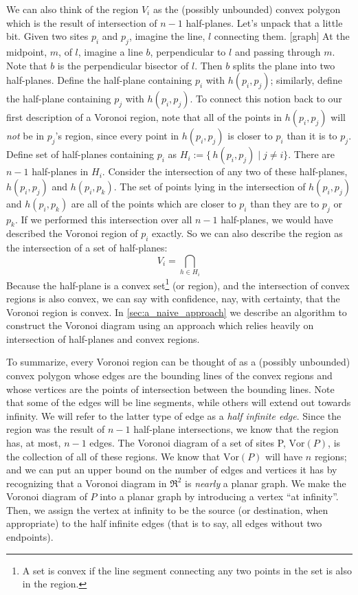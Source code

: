 \documentclass[12pt,twoside]{reedthesis}
\begin{document}
    We can also think of the region $V_{i}$ as the (possibly unbounded) convex polygon which is the result of intersection of $n-1$ half-planes. Let's unpack that a little bit. Given two sites $p_{i}$ and $p_{j}$, imagine the line, $l$ connecting them. [graph] At the midpoint, $m$, of $l$, imagine a line $b$, perpendicular to $l$ and passing through $m$. Note that $b$ is the perpendicular bisector of $l$. Then $b$ splits the plane into two half-planes. Define the half-plane containing $p_{i}$ with $h(p_{i}, p_{j})$; similarly, define the half-plane containing $p_{j}$ with $h(p_{i}, p_{j})$. To connect this notion back to our first description of a Voronoi region, note that all of the points in $h(p_{i}, p_{j})$ will \emph{not} be in $p_{j}$'s region, since every point in $h(p_{i}, p_{j})$ is closer to $p_{i}$ than it is to $p_{j}$. Define set of half-planes containing $p_{i}$ as $H_{i} := \{\,h(p_{i}, p_{j}) \mid j\neq i \}$. There are $n-1$ half-planes in $H_{i}$. Consider the intersection of any two of these half-planes, $h(p_{i}, p_{j})$ and $h(p_{i}, p_{k})$. The set of points lying in the intersection of $h(p_{i}, p_{j})$ and $h(p_{i}, p_{k})$ are all of the points which are closer to $p_{i}$ than they are to $p_{j}$ or $p_{k}$. If we performed this intersection over all $n-1$ half-planes, we would have described the Voronoi region of $p_{i}$ exactly. So we can also describe the region as the intersection of a set of half-planes:
    $$V_{i} = \bigcap_{h \in H_{i}}$$ 
    Because the half-plane is a convex set\footnote{A set is convex if the line segment connecting any two points in the set is also in the region.} (or region), and the intersection of convex regions is also convex, we can say with confidence, nay, with certainty, that the Voronoi region is convex. In \cref{sec:a_naive_approach} we describe an algorithm to construct the Voronoi diagram using an approach which relies heavily on intersection of half-planes and convex regions.\par
    To summarize, every Voronoi region can be thought of as a (possibly unbounded) convex polygon whose edges are the bounding lines of the convex regions and whose vertices are the points of intersection between the bounding lines. Note that some of the edges will be line segments, while others will extend out towards infinity. We will refer to the latter type of edge as a \emph{half infinite edge}. Since the region was the result of $n-1$ half-plane intersections, we know that the region has, at most, $n-1$ edges. The Voronoi diagram of a set of sites P, $\mbox{Vor}(P)$, is the collection of all of these regions.
    We know that $\mbox{Vor}(P)$ will have $n$ regions; and we can put an upper bound on the number of edges and vertices it has by recognizing that a Voronoi diagram in $\Re^2$ is \emph{nearly} a planar graph. We make the Voronoi diagram of $P$ into a planar graph by introducing a vertex ``at infinity''. Then, we assign the vertex at infinity to be the source (or destination, when appropriate) to the half infinite edges (that is to say, all edges without two endpoints).\par
\end{document}
